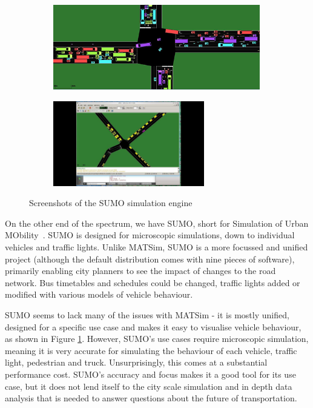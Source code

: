 \documentclass[ %
                    author={Alexander Hill},
                supervisor={Dr. Benjamin Sach},
                    degree={MEng},
                     title={MARMOSET},
                  subtitle={Multi-Agent Route Management using Online Simulation for Efficient Transportation},
                      type={research},
                      year={2016} ]{dissertation}
\begin{document}
\begin{figure}[h]
    \centering
    \begin{subfigure}[b]{0.45\textwidth}
        \centering
        \includegraphics[height=10em]{sumo-1}
    \end{subfigure}
    \hspace{1em}
    \begin{subfigure}[b]{0.45\textwidth}
        \centering
        \includegraphics[height=10em,clip,trim=7cm 0 7cm 0]{sumo-2}
    \end{subfigure}
    \caption{Screenshots of the SUMO simulation engine}\label{fig:sumo}
\end{figure}

On the other end of the spectrum, we have SUMO, short for Simulation of Urban
MObility~\cite{sumo}. SUMO is designed for microscopic simulations, down to
individual vehicles and traffic lights. Unlike MATSim, SUMO is a more focussed
and unified project (although the default distribution comes with nine pieces of
software), primarily enabling city planners to see the impact of changes to the
road network. Bus timetables and schedules could be changed, traffic lights
added or modified with various models of vehicle behaviour.

SUMO seems to lack many of the issues with MATSim - it is mostly unified,
designed for a specific use case and makes it easy to visualise vehicle
behaviour, as shown in Figure \ref{fig:sumo}. However, SUMO's use cases require
microscopic simulation, meaning it is very accurate for simulating the behaviour
of each vehicle, traffic light, pedestrian and truck. Unsurprisingly, this comes
at a substantial performance cost. SUMO's accuracy and focus makes it a good
tool for its use case, but it does not lend itself to the city scale simulation
and in depth data analysis that is needed to answer questions about the future
of transportation.
\end{document}
